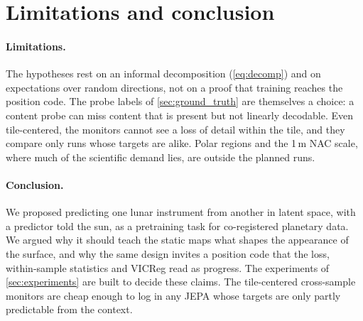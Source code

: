 \section{Limitations and conclusion}
\label{sec:conclusion}

\paragraph{Limitations.} The hypotheses rest on an informal decomposition (\cref{eq:decomp}) and on expectations over random directions, not on a proof that training reaches the position code. The probe labels of \cref{sec:ground_truth} are themselves a choice: a content probe can miss content that is present but not linearly decodable. Even tile-centered, the monitors cannot see a loss of detail within the tile, and they compare only runs whose targets are alike. Polar regions and the 1\,m NAC scale, where much of the scientific demand lies, are outside the planned runs.

\paragraph{Conclusion.} We proposed predicting one lunar instrument from another in latent space, with a predictor told the sun, as a pretraining task for co-registered planetary data. We argued why it should teach the static maps what shapes the appearance of the surface, and why the same design invites a position code that the loss, within-sample statistics and VICReg read as progress. The experiments of \cref{sec:experiments} are built to decide these claims. The tile-centered cross-sample monitors are cheap enough to log in any JEPA whose targets are only partly predictable from the context. 
